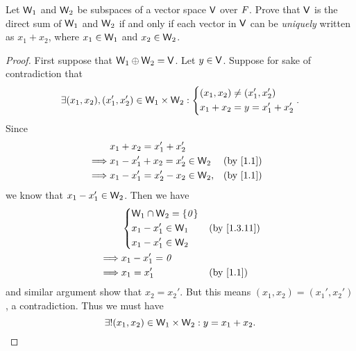 \begin{ex}\label{ex:1.3.30}
  Let \(\mathsf{W}_1\) and \(\mathsf{W}_2\) be subspaces of a vector space \(\mathsf{V}\) over \(\mathit{F}\).
  Prove that \(\mathsf{V}\) is the direct sum of \(\mathsf{W}_1\) and \(\mathsf{W}_2\) if and only if each vector in \(\mathsf{V}\) can be \emph{uniquely} written as \(x_1 + x_2\), where \(x_1 \in \mathsf{W}_1\) and \(x_2 \in \mathsf{W}_2\).
\end{ex}

\begin{proof}
  First suppose that \(\mathsf{W}_1 \oplus \mathsf{W}_2 = \mathsf{V}\).
  Let \(y \in \mathsf{V}\).
  Suppose for sake of contradiction that
  \[
    \exists (x_1, x_2), (x_1', x_2') \in \mathsf{W}_1 \times \mathsf{W}_2 : \begin{dcases}
      (x_1, x_2) \neq (x_1', x_2') \\
      x_1 + x_2 = y = x_1' + x_2'
    \end{dcases}.
  \]
  Since
  \begin{align*}
             & x_1 + x_2 = x_1' + x_2'                                       \\
    \implies & x_1 - x_1' + x_2 = x_2' \in \W_2  &  & \text{(by \cref{1.1})} \\
    \implies & x_1 - x_1' = x_2' - x_2 \in \W_2, &  & \text{(by \cref{1.1})}
  \end{align*}
  we know that \(x_1 - x_1' \in \mathsf{W}_2\).
  Then we have
  \begin{align*}
             & \begin{dcases}
      \W_1 \cap \W_2 = \set{\zv} \\
      x_1 - x_1' \in \W_1        \\
      x_1 - x_1' \in \W_2
    \end{dcases} &  & \text{(by \cref{1.3.11})} \\
    \implies & x_1 - x_1' = \zv                                           \\
    \implies & x_1 = x_1'                  &  & \text{(by \cref{1.1})}
  \end{align*}
  and similar argument show that \(x_2 = x_2'\).
  But this means \((x_1, x_2) = (x_1', x_2')\), a contradiction.
  Thus we must have
  \[
    \exists! (x_1, x_2) \in \mathsf{W}_1 \times \mathsf{W}_2 : y = x_1 + x_2.
  \]


\end{proof}
